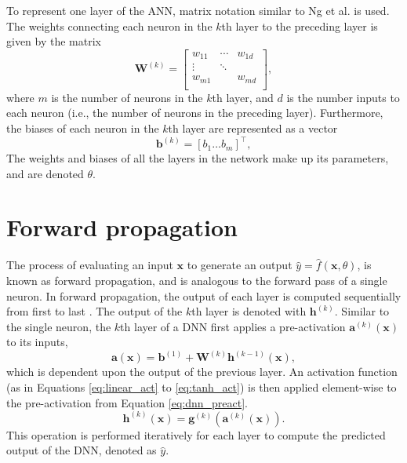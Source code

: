 To represent one layer of the ANN, matrix notation similar to Ng et al. \cite{Ng2019} is used.
The weights connecting each neuron in the $k$th layer to the preceding layer is given by the matrix
\begin{equation}
    \mathbf{W}^{(k)} = 
    \begin{bmatrix}
        w_{11} & \cdots &  w_{1d}   \\
        \vdots & \ddots &           \\
        w_{m1} &        & w_{md}    \\
    \end{bmatrix}, 
\end{equation}
where $m$ is the number of neurons in the $k$th layer, and $d$ is the number inputs to each neuron (i.e., the number of neurons in the preceding layer).
Furthermore, the biases of each neuron in the $k$th layer are represented as a vector
\begin{equation}
    \mathbf{b}^{(k)} = [ b_1 \ldots b_m ]^\intercal,
\end{equation}
The weights and biases of all the layers in the network make up its parameters, and are denoted $\theta$.






\section{Forward propagation}

The process of evaluating an input $\bm{x}$ to generate an output $\hat{y} = \hat{f}(\bm{x},\theta)$, is known as forward propagation, and is analogous to the forward pass of a single neuron.
In forward propagation, the output of each layer is computed sequentially from first to last \cite{Goodfellow2016}.
The output of the $k$th layer is denoted with $\mathbf{h}^{(k)}$.
Similar to the single neuron, the $k$th layer of a DNN first applies a pre-activation $\bm{a}^{(k)}(\bm{x})$ to its inputs,
\begin{equation}\label{eq:dnn_preact}
    \bm{a}(\bm{x}) = \mathbf{b}^{(1)} + \mathbf{W}^{(k)} \mathbf{h}^{(k-1)}(\bm{x}),
\end{equation}
which is dependent upon the output of the previous layer.
An activation function (as in Equations \ref{eq:linear_act} to \ref{eq:tanh_act}) is then applied element-wise to the pre-activation from Equation \ref{eq:dnn_preact}.
\begin{equation}\label{eq:dnn_act}
    \mathbf{h}^{(k)}(\bm{x}) = \bm{g}^{(k)}( \bm{a}^{(k)} (\bm{x}) ).
\end{equation}
This operation is performed iteratively for each layer to compute the predicted output of the DNN, denoted as $\hat{y}$.

